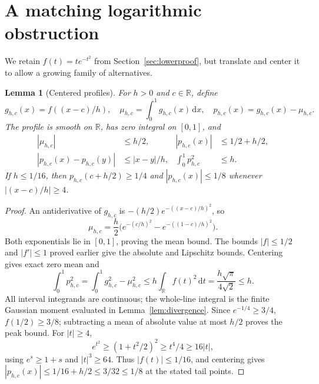 \documentclass[11pt]{article}
\newtheorem{lemma}[theorem]{Lemma}
\theoremstyle{remark}
\newcommand{\R}{\mathbb R}
\newcommand{\dd}{\,\mathrm d}
\begin{document}
\section{A matching logarithmic obstruction}
\label{sec:logproof}
We retain $f(t)=te^{-t^2}$ from Section~\ref{sec:lowerproof}, but
translate and center it to allow a growing family of alternatives.

\begin{lemma}[Centered profiles]\label{lem:logprofile}
For $h>0$ and $c\in\R$, define
\[
 g_{h,c}(x)=f((x-c)/h),\quad
 \mu_{h,c}=\int_0^1 g_{h,c}(x)\dd x,\quad
 p_{h,c}(x)=g_{h,c}(x)-\mu_{h,c}.
\]
The profile is smooth on $\R$, has zero integral on $[0,1]$, and
\begin{align}
 |\mu_{h,c}|&\le h/2,& |p_{h,c}(x)|&\le1/2+h/2,\label{eq:logprofile}\\
 |p_{h,c}(x)-p_{h,c}(y)|&\le|x-y|/h,&
 \int_0^1p_{h,c}^2&\le h.\nonumber
\end{align}
If $h\le1/16$, then $p_{h,c}(c+h/2)\ge1/4$ and
$|p_{h,c}(x)|\le1/8$ whenever $|(x-c)/h|\ge4$.
\end{lemma}
\begin{proof}
An antiderivative of $g_{h,c}$ is
$-(h/2)e^{-((x-c)/h)^2}$, so
\[
 \mu_{h,c}=\frac h2\bigl(e^{-(c/h)^2}-e^{-((1-c)/h)^2}\bigr).
\]
Both exponentials lie in $[0,1]$, proving the mean bound.
The bounds $|f|\le1/2$ and $|f'|\le1$ proved earlier give the
absolute and Lipschitz bounds. Centering gives exact zero mean and
\[
 \int_0^1p_{h,c}^2
 =\int_0^1g_{h,c}^2-\mu_{h,c}^2
 \le h\int_\R f(t)^2\dd t
 =\frac{h\sqrt\pi}{4\sqrt2}\le h.
\]
All interval integrands are continuous; the whole-line integral is
the finite Gaussian moment evaluated in Lemma~\ref{lem:divergence}.
Since $e^{-1/4}\ge3/4$, $f(1/2)\ge3/8$; subtracting a mean of
absolute value at most $h/2$ proves the peak bound.
For $|t|\ge4$,
\[
 e^{t^2}\ge(1+t^2/2)^2\ge t^4/4\ge16|t|,
\]
using $e^s\ge1+s$ and $|t|^3\ge64$.
Thus $|f(t)|\le1/16$, and centering gives
$|p_{h,c}(x)|\le1/16+h/2\le3/32\le1/8$ at the stated tail points.
\end{proof}
\end{document}

